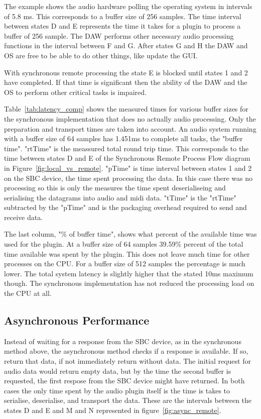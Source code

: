 The example shows the audio hardware polling the operating system in intervals of 5.8 ms. This corresponds to a buffer size of 256 samples. The time interval between states D and E represents the time it takes for a plugin to process a buffer of 256 sample. The DAW  performs other necessary audio processing functions in the interval between F and G. After states G and H the DAW and OS are free to be able to do other things, like update the GUI.

With synchronous remote processing the state E is blocked until states 1 and 2 have completed. If that time is significant then the ability of the DAW and the OS to perform other critical tasks is impaired.



Table~\ref{tab:latency_comp} shows the measured times for various buffer sizes for the synchronous implementation that does no actually audio processing. Only the preparation and transport times are taken into account. An audio system running with a buffer size of 64 samples has 1.451ms to complete all tasks, the "buffer time". "rtTime" is the meassured total round trip time. This corresponds to the time between states D and E of the Synchronous Remote Process Flow diagram in Figure~\ref{fig:local_vs_remote}. "pTime" is time interval between states 1 and 2 on the SBC device, the time spent processing the data. In this case there was no processing so this is only the measures the time spent deserialiseing and serialising the datagrams into audio and midi data. "tTime" is the "rtTime" subtracted by the "pTime" and is the packaging overhead required to send and receive data.

The last column, "\% of buffer time", shows what percent of the available time was used for the plugin. At a buffer size of 64 samples 39.59\% percent of the total time available was spent by the plugin. This does not leave much time for other processes on the CPU. For a buffer size of 512 samples the percentage is much lower. The total system latency is slightly higher that the stated 10ms maximum though. The synchronous implementation has not reduced the processing load on the CPU at all.


\subsection{Asynchronous Performance}

Instead of waiting for a response from the SBC device, as in the synchronous method above, the asynchronous method checks if a response is available. If so, return that data, if not immediately return without data. The initial request for audio data would return empty data, but by the time the second buffer is requested, the first respose from the SBC device might have returned. In both cases the only time spent by the audio plugin itself is the time is takes to serialise, deserialise, and transport the data. These are the intervals between the states D and E and M and N represented in figure~\ref{fig:async_remote}.

